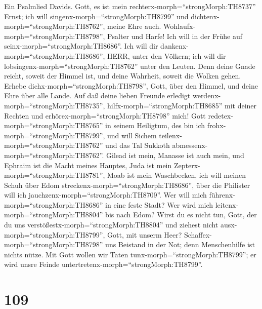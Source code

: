  Ein Psalmlied Davids. Gott, es ist mein
rechterx-morph=``strongMorph:TH8737'' Ernst; ich will
singenx-morph=``strongMorph:TH8799'' und
dichtenx-morph=``strongMorph:TH8762'', meine Ehre auch. 
Wohlaufx-morph=``strongMorph:TH8798'', Psalter und Harfe! Ich will in
der Frühe auf seinx-morph=``strongMorph:TH8686''.  Ich will
dir dankenx-morph=``strongMorph:TH8686'', HERR, unter den Völkern; ich
will dir lobsingenx-morph=``strongMorph:TH8762'' unter den Leuten.
 Denn deine Gnade reicht, soweit der Himmel ist, und deine
Wahrheit, soweit die Wolken gehen.  Erhebe
dichx-morph=``strongMorph:TH8798'', Gott, über den Himmel, und deine
Ehre über alle Lande.  Auf daß deine lieben Freunde erledigt
werdenx-morph=``strongMorph:TH8735'', hilfx-morph=``strongMorph:TH8685''
mit deiner Rechten und erhörex-morph=``strongMorph:TH8798'' mich!
 Gott redetex-morph=``strongMorph:TH8765'' in seinem
Heiligtum, des bin ich frohx-morph=``strongMorph:TH8799'', und will
Sichem teilenx-morph=``strongMorph:TH8762'' und das Tal Sukkoth
abmessenx-morph=``strongMorph:TH8762''.  Gilead ist mein,
Manasse ist auch mein, und Ephraim ist die Macht meines Hauptes, Juda
ist mein Zepterx-morph=``strongMorph:TH8781'',  Moab ist
mein Waschbecken, ich will meinen Schuh über Edom
streckenx-morph=``strongMorph:TH8686'', über die Philister will ich
jauchzenx-morph=``strongMorph:TH8709''.  Wer will mich
führenx-morph=``strongMorph:TH8686'' in eine feste Stadt? Wer wird mich
leitenx-morph=``strongMorph:TH8804'' bis nach Edom?  Wirst
du es nicht tun, Gott, der du uns
verstößestx-morph=``strongMorph:TH8804'' und ziehest nicht
ausx-morph=``strongMorph:TH8799'', Gott, mit unserm Heer? 
Schaffex-morph=``strongMorph:TH8798'' uns Beistand in der Not; denn
Menschenhilfe ist nichts nütze.  Mit Gott wollen wir Taten
tunx-morph=``strongMorph:TH8799''; er wird unsre Feinde
untertretenx-morph=``strongMorph:TH8799''.

\hypertarget{section-108}{%
\section{109}\label{section-108}}

